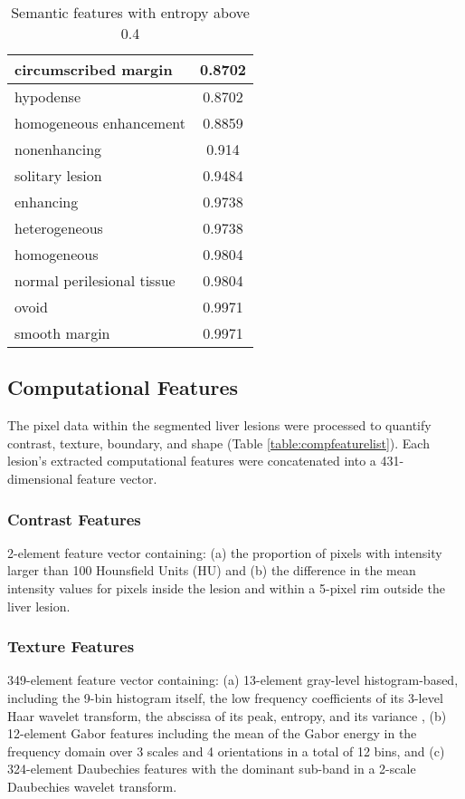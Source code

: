 \begin{table}[ht!]
\begin{tabular}{|l|c|}
		circumscribed margin & 0.8702 \\ \hline
		hypodense & 0.8702 \\ \hline
		homogeneous enhancement & 0.8859 \\ \hline
		nonenhancing & 0.914 \\ \hline
		solitary lesion & 0.9484 \\ \hline
		enhancing & 0.9738 \\ \hline
		heterogeneous & 0.9738 \\ \hline
		homogeneous & 0.9804 \\ \hline
		normal perilesional tissue & 0.9804 \\ \hline
		ovoid & 0.9971 \\ \hline
		smooth margin & 0.9971 \\ \hline
	\end{tabular}
	\caption{Semantic features with entropy above 0.4}
	\label{table:semanticfeaturelist}
\end{table}



\subsection{Computational Features}
The pixel data within the segmented liver lesions were processed to quantify contrast, texture, boundary, and shape (Table \ref{table:compfeaturelist}). Each lesion's extracted computational features were concatenated into a 431-dimensional feature vector.

\subsubsection{Contrast Features}
2-element feature vector containing: (a) the proportion of pixels with intensity larger than 100 Hounsfield Units (HU) and (b) the difference in the mean intensity values for pixels inside the lesion and within a 5-pixel rim outside the liver lesion.

\subsubsection{Texture Features}
349-element feature vector containing: (a) 13-element gray-level histogram-based, including the 9-bin histogram itself, the low frequency coefficients of its 3-level Haar wavelet transform, the abscissa of its peak, entropy, and its variance \cite{Strela:2002vq}, (b) 12-element Gabor features \cite{Zhao:2005wb} including the mean of the Gabor energy in the frequency domain over 3 scales and 4 orientations in a total of 12 bins, and (c) 324-element Daubechies features with the dominant sub-band in a 2-scale Daubechies wavelet transform.

